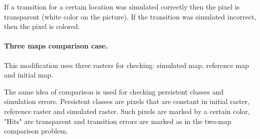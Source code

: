 \documentclass{report}
\begin{document}
If a transition for a certain location was simulated correctly then the pixel is transparent (white color on the picture). If the transition was simulated incorrect, then the pixel is colored.

\paragraph{Three maps comparison case.}
This modification uses three rasters for checking: simulated map, reference map and initial map.

The same idea of comparison is used for checking persistent classes and simulation errors. Persistent classes are pixels that are constant in initial raster, reference raster and simulated raster. Such pixels are marked by a certain color, "Hits" are transparent and transition errors are marked as in the two-map comparison problem. 



\end{document}
